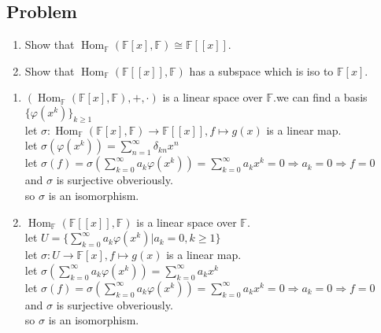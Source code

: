 \documentclass[11pt]{ctexart}
\theoremstyle{definition}
\numberwithin{equation}{section}
\newcommand{\op}[1]{\operatorname{#1}}%
\newcommand{\FF}{\mathbb{F}}%
\theoremstyle{definition}
\theoremstyle{remark}
\begin{document}
\subsection{Problem}
\begin{enumerate}
    \item Show that $\op{Hom}_{\FF}(\FF[x],\FF)\cong \FF[[x]]$.
    \item Show that $\op{Hom}_{\FF}(\FF[[x]],\FF)$ has a subspace which is iso to $\FF[x]$.
\end{enumerate}
\begin{aaa}
    \begin{enumerate}
        \item $(\op{Hom}_{\FF}(\FF[x],\FF),+,\cdot)$ is a linear space over $\FF$.we can find a basis $\{\varphi(x^k)\}_{k \geq 1}$\\let $\sigma:\op{Hom}_{\FF}(\FF[x],\FF)\to \FF[[x]],f \mapsto g(x)$ is a linear map.\\let $\sigma(\varphi(x^k))=\sum_{n=1}^\infty \delta_{kn}x^n$\\let $\sigma(f)=\sigma(\sum_{k=0}^{\infty}a_k\varphi(x^k))=\sum_{k=0}^{\infty}a_kx^k=0\Rightarrow a_k=0 \Rightarrow f=0$\\and $\sigma$ is surjective obveriously.\\so $\sigma$ is an isomorphism.
        \item $\op{Hom}_{\FF}(\FF[[x]],\FF)$ is a linear space over $\FF$.\\let $U=\{\sum_{k=0}^{\infty}a_k\varphi(x^k)|a_k=0,k\geq 1\}$\\let $\sigma:U\to \FF[x],f \mapsto g(x)$ is a linear map.\\let $\sigma(\sum_{k=0}^{\infty}a_k\varphi(x^k))=\sum_{k=0}^{\infty}a_kx^k$\\let $\sigma(f)=\sigma(\sum_{k=0}^{\infty}a_k\varphi(x^k))=\sum_{k=0}^{\infty}a_kx^k=0\Rightarrow a_k=0 \Rightarrow f=0$\\and $\sigma$ is surjective obveriously.\\so $\sigma$ is an isomorphism.
    \end{enumerate}
\end{aaa}
\end{document}
